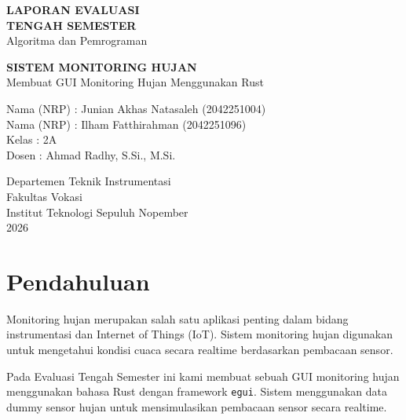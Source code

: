 \documentclass[a4paper,12pt]{article}
\begin{document}
\begin{titlepage}
    \centering
    
    \vspace*{2cm}
    
    {\Huge \textbf{LAPORAN EVALUASI}}\\[0.5cm]
    {\Huge \textbf{TENGAH SEMESTER}}\\[0.5cm]
    {\LARGE Algoritma dan Pemrograman}\\[1cm]
    
    \vspace{2cm}
    
    {\Huge \textbf{SISTEM MONITORING HUJAN}}\\[0.5cm]
    {\Large Membuat GUI Monitoring Hujan Menggunakan Rust}\\
    
    \vspace{3cm}
    
    \begin{flushleft}
    Nama (NRP) : Junian Akhas Natasaleh (2042251004)\\
    Nama (NRP) : Ilham Fatthirahman (2042251096)\\
    Kelas : 2A\\
    Dosen : Ahmad Radhy, S.Si., M.Si.\\
    \end{flushleft}
    
    \vfill
    
    {\Large Departemen Teknik Instrumentasi}\\
    {\Large Fakultas Vokasi}\\
    {\Large Institut Teknologi Sepuluh Nopember}\\
    {\Large 2026}
    
\end{titlepage}

\section{Pendahuluan}

Monitoring hujan merupakan salah satu aplikasi penting dalam bidang instrumentasi dan Internet of Things (IoT). Sistem monitoring hujan digunakan untuk mengetahui kondisi cuaca secara realtime berdasarkan pembacaan sensor.

Pada Evaluasi Tengah Semester ini kami membuat sebuah GUI monitoring hujan menggunakan bahasa Rust dengan framework \texttt{egui}. Sistem menggunakan data dummy sensor hujan untuk mensimulasikan pembacaan sensor secara realtime.
\end{document}
